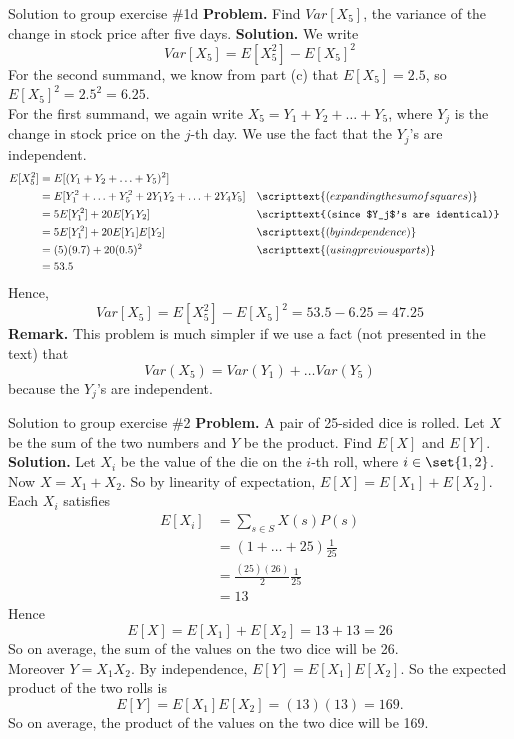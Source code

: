 \documentclass[10pt]{beamer}
\begin{document}
\begin{frame}{Solution to group exercise \#1d}
\footnotesize
\textbf{Problem.}  Find $Var[X_5]$, the variance of the change in stock price after five days. 
\vfill \vfill 
\textbf{Solution.}   We write
  \[ Var[X_5] = E[X_5^2] - E[X_5]^2 \]
  For the second summand, we know from part (c) that $E[X_5] = 2.5$, so $ E[X_5]^2 = 2.5^2 = 6.25$. \\
   \vfill 
   For the first summand, we again write $X_5 = Y_1 + Y_2 + \hdots + Y_5$, where $Y_j$ is the change in stock price on the $j$-th day.  We use the fact that the $Y_j$'s are independent.
   \begin{align*}
   E[X_5^2] &= E[(Y_1 + Y_2 + \hdots + Y_5)^2] \\
   &=E[Y_1^2 + \hdots + Y_5^2 + 2Y_1Y_2 + \hdots +2Y_4Y_5] && \scripttext{(expanding the sum of squares)}\\
   &= 5E[Y_1^2] + 20E[Y_1Y_2] && \scripttext{(since $Y_j$'s are identical)}\\
   &= 5E[Y_1^2] + 20E[Y_1]E[Y_2]  && \scripttext{(by independence)}\\
   &= (5)(9.7)  + 20(0.5)^2 && \scripttext{(using previous parts)}\\
   &= 53.5
   \end{align*}
%
Hence,
  \[ Var[X_5] = E[X_5^2] - E[X_5]^2 = 53.5 - 6.25 = 47.25 \]
\vfill \vfill 
\colorbox{red!30}{\textbf{Remark.}} This problem is much simpler if we use a fact (not presented in the text) that 
\[ Var(X_5) = Var(Y_1) + \hdots Var(Y_5)\]
because the $Y_j$'s are independent.
\end{frame}



\begin{frame}{Solution to group exercise \#2}
\footnotesize 
\textbf{Problem.} A pair of 25-sided dice is rolled. Let $X$ be the sum of the two numbers and $Y$ be the product. Find $E[X]$ and $E[Y]$.
\vfill 
\textbf{Solution.} Let $X_i$ be the value of the die on the $i$-th roll, where $i \in \set{1,2}$.   \\

Now $X=X_1+X_2$. So by linearity of expectation, $E[X]=E[X_1]+E[X_2]$.  Each $X_i$ satisfies
%
\begin{align*}
E[X_i] &= \sum_{s \in S} X(s) P(s) \\
&= (1+\hdots + 25) \frac{1}{25} \\
&= \frac{(25)(26)}{2} \frac{1}{25} \\
&=13
\end{align*}
Hence
\[E[X]=E[X_1]+E[X_2] = 13+13 =26 \]
So on average, the sum of the values on the two dice will be 26. \\
\vfill 
Moreover $Y=X_1 X_2$. By independence, $E[Y] = E[X_1]E[X_2]$.  So the expected product of the two rolls is
\[E[Y]=E[X_1]E[X_2] = (13)(13) = 169. \]
So on average, the product of the values on the two dice will be 169. \\

\end{frame}
\end{document}
